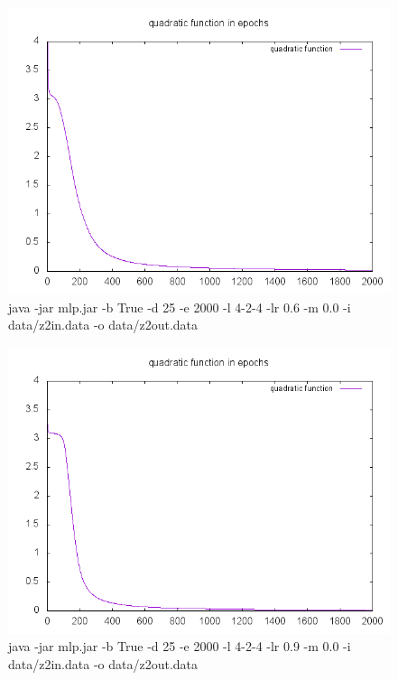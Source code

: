 \documentclass{classrep}
\begin{document}
{ 
\begin{figure}[h!]
 \centering
 \includegraphics[width=12cm]{img/424biastrue.png}
 \vspace{-0.3cm}
 \caption{java -jar mlp.jar -b True -d 25 -e 2000 -l 4-2-4 -lr 0.6 -m 0.0 -i data/z2in.data -o data/z2out.data}
\end{figure}

\newpage

\begin{figure}[h!]
 \centering
 \includegraphics[width=12cm]{img/424lr09.png}
 \vspace{-0.3cm}
 \caption{java -jar mlp.jar -b True -d 25 -e 2000 -l 4-2-4 -lr 0.9 -m 0.0 -i data/z2in.data -o data/z2out.data}
\end{figure}

}
\end{document}
